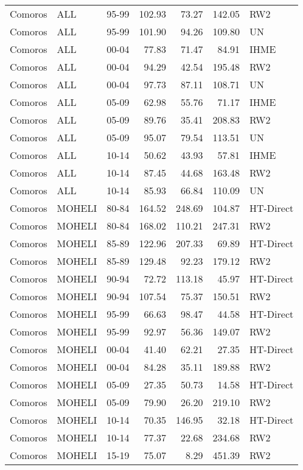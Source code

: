 \begin{longtable}{lllrrrl}
  Comoros & ALL & 95-99 & 102.93 & 73.27 & 142.05 & RW2 \\ 
  Comoros & ALL & 95-99 & 101.90 & 94.26 & 109.80 & UN \\ 
  Comoros & ALL & 00-04 & 77.83 & 71.47 & 84.91 & IHME \\ 
  Comoros & ALL & 00-04 & 94.29 & 42.54 & 195.48 & RW2 \\ 
  Comoros & ALL & 00-04 & 97.73 & 87.11 & 108.71 & UN \\ 
  Comoros & ALL & 05-09 & 62.98 & 55.76 & 71.17 & IHME \\ 
  Comoros & ALL & 05-09 & 89.76 & 35.41 & 208.83 & RW2 \\ 
  Comoros & ALL & 05-09 & 95.07 & 79.54 & 113.51 & UN \\ 
  Comoros & ALL & 10-14 & 50.62 & 43.93 & 57.81 & IHME \\ 
  Comoros & ALL & 10-14 & 87.45 & 44.68 & 163.48 & RW2 \\ 
  Comoros & ALL & 10-14 & 85.93 & 66.84 & 110.09 & UN \\ 
  Comoros & MOHELI & 80-84 & 164.52 & 248.69 & 104.87 & HT-Direct \\ 
  Comoros & MOHELI & 80-84 & 168.02 & 110.21 & 247.31 & RW2 \\ 
  Comoros & MOHELI & 85-89 & 122.96 & 207.33 & 69.89 & HT-Direct \\ 
  Comoros & MOHELI & 85-89 & 129.48 & 92.23 & 179.12 & RW2 \\ 
  Comoros & MOHELI & 90-94 & 72.72 & 113.18 & 45.97 & HT-Direct \\ 
  Comoros & MOHELI & 90-94 & 107.54 & 75.37 & 150.51 & RW2 \\ 
  Comoros & MOHELI & 95-99 & 66.63 & 98.47 & 44.58 & HT-Direct \\ 
  Comoros & MOHELI & 95-99 & 92.97 & 56.36 & 149.07 & RW2 \\ 
  Comoros & MOHELI & 00-04 & 41.40 & 62.21 & 27.35 & HT-Direct \\ 
  Comoros & MOHELI & 00-04 & 84.28 & 35.11 & 189.88 & RW2 \\ 
  Comoros & MOHELI & 05-09 & 27.35 & 50.73 & 14.58 & HT-Direct \\ 
  Comoros & MOHELI & 05-09 & 79.90 & 26.20 & 219.10 & RW2 \\ 
  Comoros & MOHELI & 10-14 & 70.35 & 146.95 & 32.18 & HT-Direct \\ 
  Comoros & MOHELI & 10-14 & 77.37 & 22.68 & 234.68 & RW2 \\ 
  Comoros & MOHELI & 15-19 & 75.07 & 8.29 & 451.39 & RW2 \\ 

\end{longtable}
